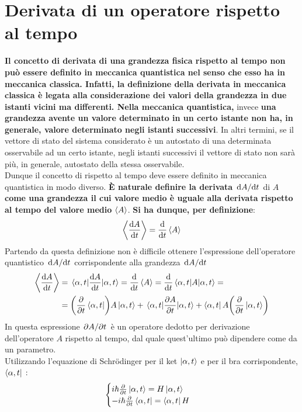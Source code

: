 \documentclass[a4paper,12pt,oneside]{book}
\begin{document}
\section{Derivata di un operatore rispetto al tempo}
\textbf{Il concetto di derivata di una grandezza fisica rispetto al tempo non può essere definito in meccanica quantistica nel senso che esso ha in meccanica classica. Infatti, la definizione della derivata in meccanica classica è legata alla considerazione dei valori della grandezza in due istanti vicini ma differenti. Nella meccanica quantistica,} invece \textbf{una grandezza avente un valore determinato in un certo istante non ha, in generale, valore determinato negli istanti successivi}.
In altri termini, se il vettore di stato del sistema considerato è un autostato di una determinata osservabile ad un certo istante, negli istanti successivi il vettore di stato non sarà più, in generale, autostato della stessa osservabile.\\
Dunque il concetto di rispetto al tempo deve essere definito in meccanica quantistica in modo diverso. \textbf{È naturale definire la derivata} $\dv*{A}{t}$ di $A$ \textbf{come una grandezza il cui valore medio è uguale alla derivata rispetto al tempo del valore medio} $\expval{A}$. \textbf{Si ha dunque, per definizione}:
\begin{equation}
  \expval{\dv{A}{t}} = \dv{t}\expval{A}
\end{equation}
Partendo da questa definizione non è difficile ottenere l'espressione dell'operatore quantistico $\dv*{A}{t}$ corrispondente alla grandezza $\dv*{A}{t}$
\begin{align}
  \label{eq:cap6_1}
  \expval{\dv{A}{t}} &= \expval{\dv{A}{t}}{\alpha,t}=\dv{t}\expval{A}=\dv{t}\expval{A}{\alpha,t}=\nonumber\\
  &=\qty(\pdv{t}\bra{\alpha,t})A\ket{\alpha,t} + \expval{\pdv{A}{t}}{\alpha,t} + \bra{\alpha,t}A\qty(\pdv{t}\ket{\alpha,t})
\end{align}
In questa espressione $\pdv*{A}{t}$ è un operatore dedotto per derivazione dell'operatore $A$ rispetto al tempo, dal quale quest'ultimo può dipendere come da un parametro.\\
Utilizzando l'equazione di Schr\"{o}dinger per il ket $\ket{\alpha,t}$  e per il bra corrispondente, $\bra{\alpha,t}$ :
\begin{equation}
  \begin{cases}
    i\hbar\pdv{t}\ket{\alpha,t} = H\ket{\alpha,t}\\
    -i\hbar\pdv{t}\bra{\alpha,t} = \bra{\alpha,t}H
  \end{cases}
\end{equation}
\end{document}
